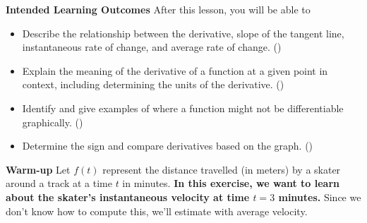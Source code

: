 \documentclass[10pt]{article}
\begin{document}
\pagestyle{otherpages}
\thispagestyle{firstpage}

\textbf{Intended Learning Outcomes}
After this lesson, you will be able to 

\begin{itemize}
    \item Describe the relationship between the derivative, slope of the tangent line, instantaneous rate of change, and average rate of change. ()
    \item Explain the meaning of the derivative of a function at a given point in context, including determining the units of the derivative. ()
    \item Identify and give examples of where a function might not be differentiable graphically. ()
    \item Determine the sign and compare derivatives based on the graph. ()
\end{itemize}

\vspace{-0.5cm}

\hrulefill

{\bf\color{blue}Warm-up}  Let $f(t)$ represent the distance travelled (in meters) by a skater around a track at a time $t$ in minutes. {\bf In this exercise, we want to learn about the skater's instantaneous velocity at time $t=3$ minutes.} Since we don't know how to compute this, we'll estimate with average velocity.\\
\end{document}

